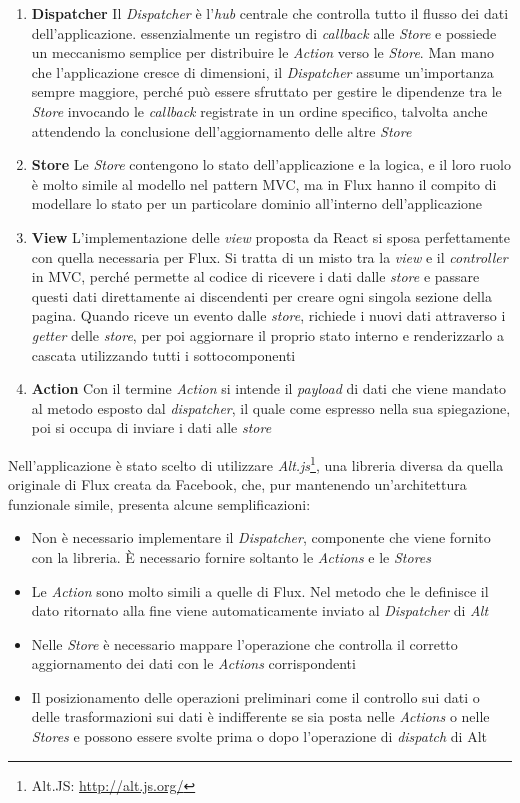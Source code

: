 \begin{enumerate}
	\item \textbf{Dispatcher}
	Il \emph{Dispatcher} è l'\emph{hub} centrale che controlla tutto il flusso dei dati dell'applicazione. \upe essenzialmente un registro di \emph{callback} alle \emph{Store} e possiede un meccanismo semplice per distribuire le \emph{Action} verso le \emph{Store}. Man mano che l'applicazione cresce di dimensioni, il \emph{Dispatcher} assume un'importanza sempre maggiore, perché può essere sfruttato per gestire le dipendenze tra le \emph{Store} invocando le \emph{callback} registrate in un ordine specifico, talvolta anche attendendo la conclusione dell'aggiornamento delle altre \emph{Store} 
	\item \textbf{Store}
	Le \emph{Store} contengono lo stato dell'applicazione e la logica, e il loro ruolo è molto simile al modello nel pattern MVC, ma in Flux hanno il compito di modellare lo stato per un particolare dominio all'interno dell'applicazione
	\item \textbf{View}
	L'implementazione delle \emph{view} proposta da React si sposa perfettamente con quella necessaria per Flux. Si tratta di un misto tra la \emph{view} e il \emph{controller} in MVC, perché permette al codice di ricevere i dati dalle \emph{store} e passare questi dati direttamente ai discendenti per creare ogni singola sezione della pagina. Quando riceve un evento dalle \emph{store}, richiede i nuovi dati attraverso i \emph{getter} delle \emph{store}, per poi aggiornare il proprio stato interno e renderizzarlo a cascata utilizzando tutti i sottocomponenti
	\item \textbf{Action}
	Con il termine \emph{Action} si intende il \emph{payload} di dati che viene mandato al metodo esposto dal \emph{dispatcher}, il quale come espresso nella sua spiegazione, poi si occupa di inviare i dati alle \emph{store}
\end{enumerate} 

Nell'applicazione è stato scelto di utilizzare \emph{Alt.js}\footnote{Alt.JS: \url{http://alt.js.org/}}, una libreria diversa da quella originale di Flux creata da Facebook, che, pur mantenendo un'ar\-chi\-tet\-tu\-ra funzionale simile, presenta alcune semplificazioni:

\begin{itemize}
	\item
	Non è necessario implementare il \emph{Dispatcher}, componente che viene fornito con la libreria. È necessario fornire soltanto le \emph{Actions}  e le \emph{Stores}
	\item
	Le \emph{Action} sono molto simili a quelle di Flux. Nel metodo che le definisce il dato ritornato alla fine viene automaticamente inviato al \emph{Dispatcher} di \emph{Alt}
	\item
	Nelle \emph{Store} è necessario mappare l'operazione che controlla il corretto aggiornamento dei dati con le \emph{Actions} corrispondenti
	\item
	Il posizionamento delle operazioni preliminari come il controllo sui dati o delle trasformazioni sui dati è indifferente se sia posta nelle \emph{Actions} o nelle \emph{Stores} e possono essere svolte prima o dopo l'operazione di \emph{dispatch} di Alt
\end{itemize}